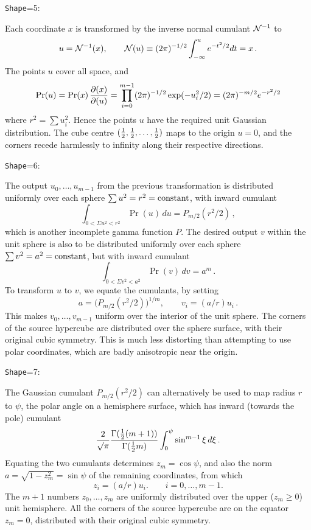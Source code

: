 \bigskip
{\tt Shape}=5: 

\noindent Each coordinate $x$ is transformed by the inverse normal cumulant ${\cal N}^{-1}$ to
$$
   u = {\cal N}^{-1}(x),\qquad {\cal N}(u) \equiv (2\pi)^{-1/2} \int_{-\infty}^u e^{-t^2/2}dt = x\,.
$$
The points $u$ cover all space, and
$$
   \Pr(u) = \Pr(x)\,{\partial(x)\over\partial(u)} = \prod_{i=0}^{m-1} (2\pi)^{-1/2} \exp(-u_i^2/2) = (2\pi)^{-m/2} e^{-r^2/2}
$$
where $r^2 = \sum u_i^2$.
Hence the points $u$ have the required unit Gaussian distribution.
The cube centre $({1\over 2}, {1\over 2}, \ldots, {1\over 2})$ maps to the origin $u=0$, and the corners recede harmlessly to infinity along their respective directions.

\bigskip
{\tt Shape}=6: 

\noindent The output $u_0,\ldots,u_{m-1}$ from the previous transformation is distributed uniformly over each sphere $\sum u^2 = r^2 = {\rm constant}$,
with inward cumulant
$$
    \int_{0 < \Sigma u^2 < r^2} \Pr(u)\,du = P_{m/2}(r^2/2)\,,
$$
which is another incomplete gamma function $P$.
The desired output $v$ within the unit sphere is also to be distributed uniformly over each sphere $\sum v^2 = a^2 = {\rm constant}$,
but with inward cumulant
$$
    \int_{0 < \Sigma v^2 < a^2} \Pr(v)\,dv = a^m\,.
$$
To transform $u$ to $v$, we equate the cumulants, by setting
$$
    a = \big(P_{m/2}(r^2/2)\big)^{1/m},\qquad v_i = (a/r)u_i\,.
$$
This makes $v_0,\ldots,v_{m-1}$ uniform over the interior of the unit sphere.
The corners of the source hypercube are distributed over the sphere surface, with their original cubic symmetry.
This is much less distorting than attempting to use polar coordinates, which are badly anisotropic near the origin.

\bigskip
{\tt Shape}=7: 

\noindent The Gaussian cumulant $P_{m/2}(r^2/2)$ can alternatively be used to map radius $r$ to $\psi$, the polar angle on a hemisphere surface, 
which has inward (towards the pole) cumulant
$$
 {2 \over \surd\pi} {\Gamma({1\over2}(m+1)) \over \Gamma({1\over2}m)} \int_0^\psi \sin^{m-1}\xi\,d\xi\,.
$$
Equating the two cumulants determines $z_m = \cos\psi$, and also the norm $a = \sqrt{1 - z_m^2} = \sin\psi$ of the remaining coordinates,
from which 
$$
   z_i = (a/r)u_i. \qquad i=0,\ldots,m-1.
$$
The $m+1$ numbers $z_0,\ldots,z_m$ are uniformly distributed over the upper ($z_m\ge 0$) unit hemisphere.
All the corners of the source hypercube are on the equator $z_m=0$, distributed with their original cubic symmetry.

